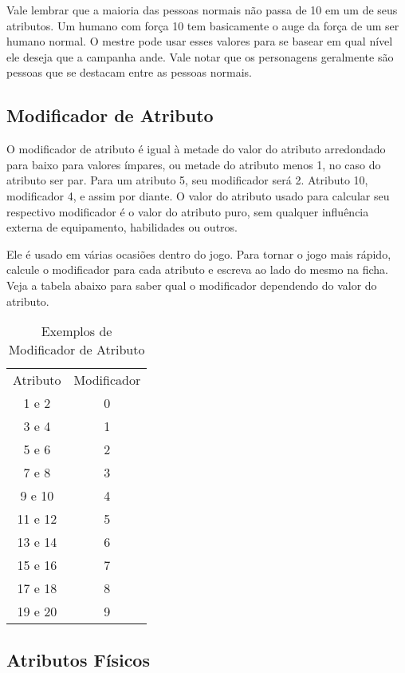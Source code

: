 Vale lembrar que a maioria das pessoas normais não passa de 10 em um de seus atributos. Um humano com força 10 tem basicamente o auge da força de um ser humano normal. O mestre pode usar esses valores para se basear em qual nível ele deseja que a campanha ande. Vale notar que os personagens geralmente são pessoas que se destacam entre as pessoas normais.

\subsection{Modificador de Atributo}

O modificador de atributo é igual à metade do valor do atributo arredondado para baixo para valores ímpares, ou metade do atributo menos 1, no caso do atributo ser par. Para um atributo 5, seu modificador será 2. Atributo 10, modificador 4, e assim por diante. O valor do atributo usado para calcular seu respectivo modificador é o valor do atributo puro, sem qualquer influência externa de equipamento, habilidades ou outros.

Ele é usado em várias ocasiões dentro do jogo. Para tornar o jogo mais rápido, calcule o modificador para cada atributo e escreva ao lado do mesmo na ficha. Veja a tabela abaixo para saber qual o modificador dependendo do valor do atributo.

\begin{table}[htbp]
\begin{center}
\begin{tabular}{|c|c|} \hline 
Atributo&	 Modificador\\\cline{1-2} 
1 e 2&	 0\\ \hline
3 e 4&	 1\\ \hline
5 e 6&	 2\\ \hline
7 e 8&	 3\\ \hline
9 e 10&	 4\\ \hline
11 e 12&	 5\\ \hline
13 e 14&	 6\\ \hline
15 e 16&	 7\\ \hline
17 e 18&	 8\\ \hline
19 e 20&	 9\\ \hline
\end{tabular}
\end{center}
\caption{Exemplos de Modificador de Atributo}
\label{}
\end{table}


\subsection{Atributos Físicos}

